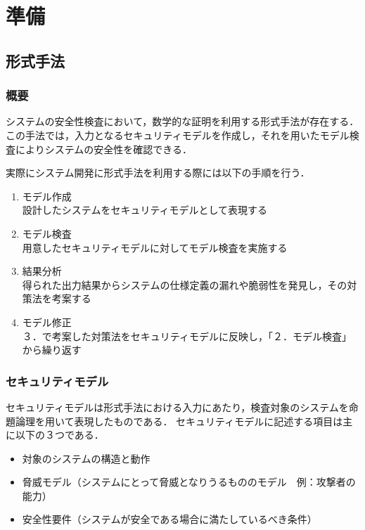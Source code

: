 \documentclass[journal]{IEEEtran}
\begin{document}
\section{準備}

\subsection{形式手法}
\subsubsection{概要}
システムの安全性検査において，数学的な証明を利用する形式手法が存在する．
この手法では，入力となるセキュリティモデルを作成し，それを用いたモデル検査によりシステムの安全性を確認できる．

実際にシステム開発に形式手法を利用する際には以下の手順を行う．
\begin{enumerate}
\item モデル作成\\
設計したシステムをセキュリティモデルとして表現する
\item モデル検査\\
用意したセキュリティモデルに対してモデル検査を実施する
\item 結果分析\\
得られた出力結果からシステムの仕様定義の漏れや脆弱性を発見し，その対策法を考案する
\item モデル修正\\
３．で考案した対策法をセキュリティモデルに反映し，「２．モデル検査」から繰り返す
\end{enumerate}

\subsubsection{セキュリティモデル}
セキュリティモデルは形式手法における入力にあたり，検査対象のシステムを命題論理を用いて表現したものである\cite{security_modeling_and_analysis}．
セキュリティモデルに記述する項目は主に以下の３つである．
\begin{itemize}
\item 対象のシステムの構造と動作
\item 脅威モデル（システムにとって脅威となりうるもののモデル　例：攻撃者の能力）
\item 安全性要件（システムが安全である場合に満たしているべき条件）
\end{itemize}
\end{document}
